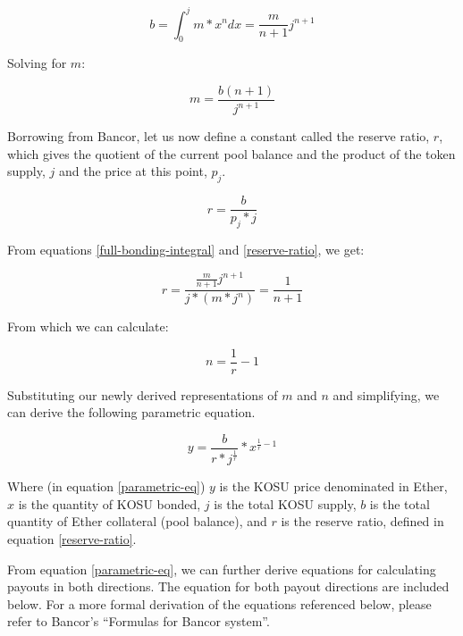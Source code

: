 \documentclass[10pt]{article}
\begin{document}
\begin{equation}\label{full-bonding-integral}
  b = \int_{0}^{j} m*x^n dx = \frac{m}{n+1}j^{n+1}
\end{equation}
\medskip

\noindent Solving for $m$: 

\begin{equation}
  m = \frac{b(n+1)}{j^{n+1}}
\end{equation}
\medskip

Borrowing from Bancor, let us now define a constant called the reserve ratio, $r$, which gives the quotient of the current pool balance and the product of the token supply, $j$ and the price at this point, $p_j$\cite{bancor-whitepaper}.

\begin{equation}\label{reserve-ratio}
  r = \frac{b}{p_j*j}
\end{equation}
\medskip

\noindent From equations \ref{full-bonding-integral} and \ref{reserve-ratio}, we get:

\begin{equation}
  r = \frac{\frac{m}{n+1}j^{n+1}}{j*(m*j^n)} = \frac{1}{n+1}
\end{equation}
\medskip

\noindent From which we can calculate:

\begin{equation}
  n = \frac{1}{r}-1
\end{equation}
\medskip

\noindent Substituting our newly derived representations of $m$ and $n$ and simplifying, we can derive the following parametric equation.

\begin{equation}\label{parametric-eq}
  y = \frac{b}{r*j^{\frac{1}{r}}}*x^{\frac{1}{r}-1}
\end{equation}

Where (in equation \ref{parametric-eq}) $y$ is the KOSU price denominated in Ether, $x$ is the quantity of KOSU bonded, $j$ is the total KOSU supply, $b$ is the total quantity of Ether collateral (pool balance), and $r$ is the reserve ratio, defined in equation \ref{reserve-ratio}.
\medskip 

From equation \ref{parametric-eq}, we can further derive equations for calculating payouts in both directions. The equation for both payout directions are included below. For a more formal derivation of the equations referenced below, please refer to Bancor’s ``Formulas for Bancor system''\cite{bancor-formulas}. 
\end{document}
